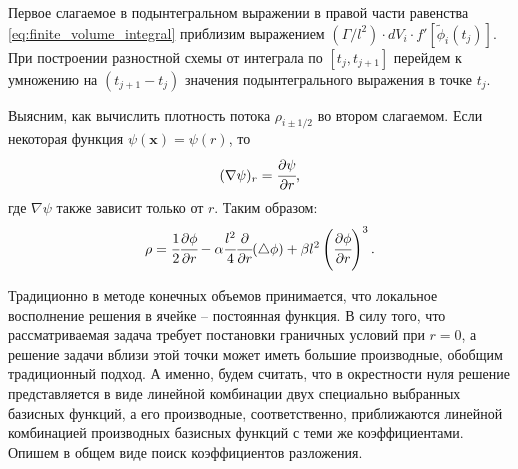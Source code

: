 Первое слагаемое в подынтегральном выражении в правой части равенства \eqref{eq:finite_volume_integral} приблизим выражением $(\Gamma/l^2) \cdot dV_i \cdot f'[\widetilde{\phi}_i(t_j)]$. При построении разностной схемы от интеграла по $[t_j, t_{j + 1}]$ перейдем к умножению на $(t_{j + 1} - t_j)$ значения подынтегрального выражения в точке $t_j$.

Выясним, как вычислить плотность потока $\rho_{i \pm 1/2}$ во втором слагаемом. Если некоторая функция $\psi(\mathbf{x}) = \psi(r)$, то
$$(\nabla \psi)_r = \cfrac{\partial \psi}{\partial r} {\text{,}}$$
где $\nabla \psi$ также зависит только от $r$. Таким образом:
\begin{equation}
    \rho = \cfrac{1}{2} \cfrac{\partial \phi}{\partial r} - \alpha \cfrac{l^2}{4} \cfrac{\partial}{\partial r} (\triangle \phi) + \beta l^2 \left( \cfrac{\partial \phi}{\partial r} \right)^3 {\text{.}}
    \label{eq:finite_volumes_density}
\end{equation}

Традиционно в методе конечных объемов принимается, что локальное восполнение решения в ячейке -- постоянная функция. В силу того, что рассматриваемая задача требует постановки граничных условий при $r = 0$, а решение задачи вблизи этой точки может иметь большие производные, обобщим традиционный подход. А именно, будем считать, что в окрестности нуля решение представляется в виде линейной комбинации двух специально выбранных базисных функций, а его производные, соответственно, приближаются линейной комбинацией производных базисных функций с теми же коэффициентами. Опишем в общем виде поиск коэффициентов разложения.

